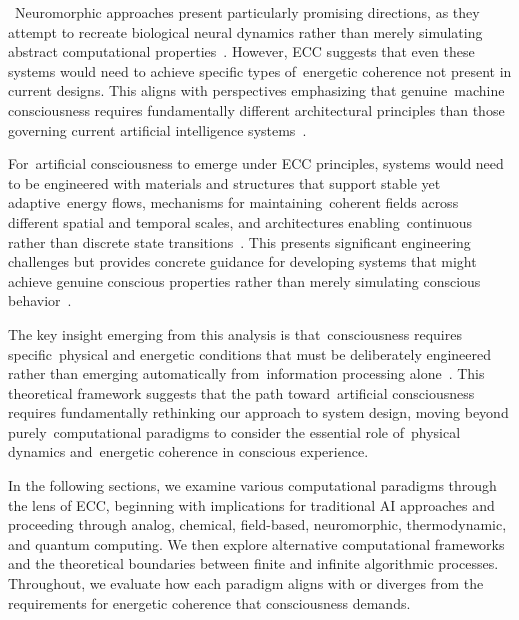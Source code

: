 \begin{refsection}
    ~Neuromorphic approaches present particularly promising directions, as they attempt to recreate biological neural dynamics rather than merely simulating abstract computational properties~\cite{Shanahan2010, Indiveri2020, Schuman2021}. However, ECC suggests that even these systems would need to achieve specific types of~energetic coherence not present in current designs. This aligns with perspectives emphasizing that genuine~machine consciousness requires fundamentally different architectural principles than those governing current artificial intelligence systems~\cite{Holland2003, Tononi2015, seth2024conscious}.

    For~artificial consciousness to emerge under ECC principles, systems would need to be engineered with materials and structures that support stable yet adaptive~energy flows, mechanisms for maintaining~coherent fields across different spatial and temporal scales, and architectures enabling~continuous rather than discrete state transitions~\cite{Pfeifer2006, Pribram2017, Werbos2018}. This presents significant engineering challenges but provides concrete guidance for developing systems that might achieve genuine conscious properties rather than merely simulating conscious behavior~\cite{Clark2013, Aleksander2005}.

    The key insight emerging from this analysis is that~consciousness requires specific~physical and energetic conditions that must be deliberately engineered rather than emerging automatically from~information processing alone~\cite{DiPaolo2005, Metzinger2003}. This theoretical framework suggests that the path toward~artificial consciousness requires fundamentally rethinking our approach to system design, moving beyond purely~computational paradigms to consider the essential role of~physical dynamics and~energetic coherence in conscious experience.

    In the following sections, we examine various computational paradigms through the lens of ECC, beginning with implications for traditional AI approaches and proceeding through analog, chemical, field-based, neuromorphic, thermodynamic, and quantum computing. We then explore alternative computational frameworks and the theoretical boundaries between finite and infinite algorithmic processes. Throughout, we evaluate how each paradigm aligns with or diverges from the requirements for energetic coherence that consciousness demands.


\end{refsection}
